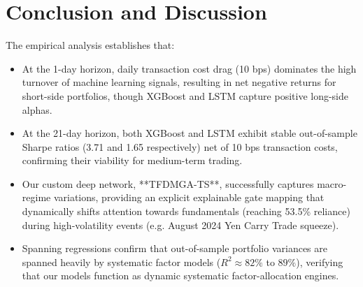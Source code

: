 \documentclass[11pt]{article}
\begin{document}
\section{Conclusion and Discussion}
The empirical analysis establishes that:
\begin{itemize}
    \item At the 1-day horizon, daily transaction cost drag (10 bps) dominates the high turnover of machine learning signals, resulting in net negative returns for short-side portfolios, though XGBoost and LSTM capture positive long-side alphas.
    \item At the 21-day horizon, both XGBoost and LSTM exhibit stable out-of-sample Sharpe ratios (3.71 and 1.65 respectively) net of 10 bps transaction costs, confirming their viability for medium-term trading.
    \item Our custom deep network, **TFDMGA-TS**, successfully captures macro-regime variations, providing an explicit explainable gate mapping that dynamically shifts attention towards fundamentals (reaching 53.5\% reliance) during high-volatility events (e.g. August 2024 Yen Carry Trade squeeze).
    \item Spanning regressions confirm that out-of-sample portfolio variances are spanned heavily by systematic factor models ($R^2 \approx 82\%$ to $89\%$), verifying that our models function as dynamic systematic factor-allocation engines.
\end{itemize}
\end{document}
